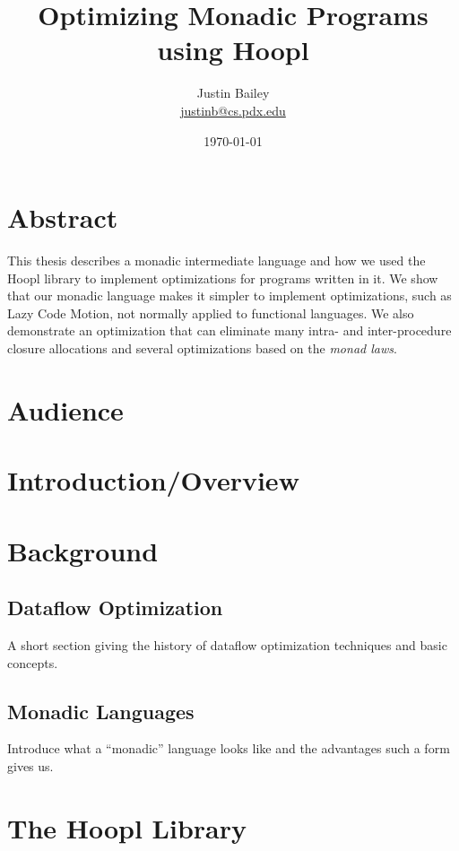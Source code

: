 \documentclass[11pt]{article}
\title{Optimizing Monadic Programs using Hoopl}
\author{Justin Bailey \\ \url{justinb@cs.pdx.edu}}
\date{\today}
\begin{document}
\VerbatimFootnotes
\DefineShortVerb{\#}
\doublespacing

\maketitle

\section{Abstract}

This thesis describes a monadic intermediate language and how we used
the Hoopl library to implement optimizations for programs written in
it. We show that our monadic language makes it simpler to implement
optimizations, such as Lazy Code Motion, not normally applied to
functional languages. We also demonstrate an optimization that can
eliminate many intra- and inter-procedure closure allocations and
several optimizations based on the \emph{monad laws}.

\section{Audience}

\section{Introduction/Overview}

\section{Background}
\subsection{Dataflow Optimization}

A short section giving the history of dataflow optimization techniques
and basic concepts.

\subsection{Monadic Languages}

Introduce what a ``monadic'' language looks like and the advantages such a form
gives us.

\section{The Hoopl Library}
\end{document}
